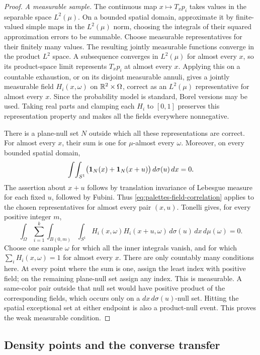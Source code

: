 \begin{proof}
\smallskip
\noindent\emph{A measurable sample.}
The continuous map
\(x\mapsto T_xp_i\) takes values in the separable space \(L^2(\mu)\).
On a bounded spatial domain, approximate it by finite-valued simple
maps in the \(L^2(\mu)\) norm, choosing the integrals of their squared
approximation errors to be summable.  Choose measurable representatives
for their finitely many values.  The resulting jointly measurable
functions converge in the product \(L^2\) space.  A subsequence converges
in \(L^2(\mu)\) for almost every \(x\), so its product-space limit represents
\(T_xp_i\) at almost every \(x\).  Applying this on a countable
exhaustion, or on its disjoint measurable annuli, gives a jointly
measurable field \(H_i(x,\omega)\) on \(\mathbb R^2\times\Omega\), correct
as an \(L^2(\mu)\) representative for almost every \(x\).
Since the probability model is standard, Borel versions may be used.
Taking real parts and clamping each \(H_i\) to \([0,1]\) preserves this representation
property and makes all the fields everywhere nonnegative.

There is a plane-null set \(N\) outside which all these representations
are correct.  For almost every \(x\), their sum is one for
\(\mu\)-almost every \(\omega\).  Moreover, on every bounded
spatial domain,
\[
 \int\!\int_{S^1}
   \bigl(\mathbf 1_N(x)+\mathbf 1_N(x+u)\bigr)\,d\sigma(u)\,dx=0.
\]
The assertion about \(x+u\) follows by translation invariance of
Lebesgue measure for each fixed \(u\), followed by Fubini.
Thus \eqref{eq:palettes-field-correlation} applies to the chosen
representatives for almost every pair \((x,u)\).
Tonelli gives, for every positive integer \(m\),
\[
 \int_\Omega\sum_{i=1}^k
       \int_{B(0,m)}\int_{S^1}
       H_i(x,\omega)H_i(x+u,\omega)\,d\sigma(u)\,dx\,d\mu(\omega)=0.
\]
Choose one sample \(\omega\) for which all the inner integrals vanish,
and for which \(\sum_iH_i(x,\omega)=1\) for almost every \(x\).
There are only countably many conditions here.  At every point
where the sum is one, assign the least index with positive field;
on the remaining plane-null set assign any index.  This is measurable.
A same-color pair outside that null set would have positive product
of the corresponding fields, which occurs only on a
\(dx\,d\sigma(u)\)-null set.  Hitting the spatial exceptional set at
either endpoint is also a product-null event.  This proves the
weak measurable condition.
\end{proof}

\subsection{Density points and the converse transfer}


